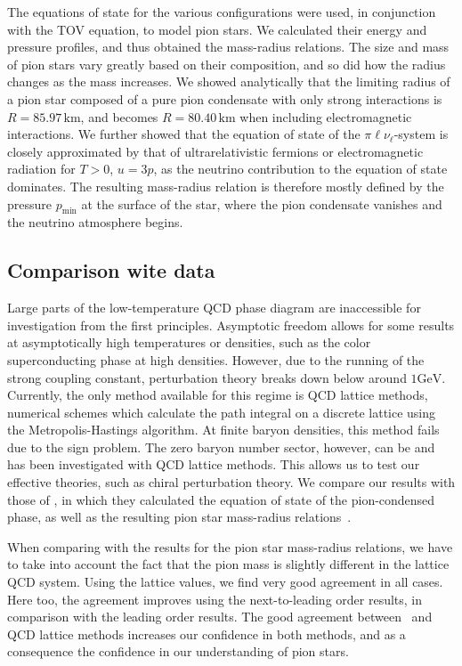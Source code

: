The equations of state for the various configurations were used, in conjunction with the TOV equation, to model pion stars.
We calculated their energy and pressure profiles, and thus obtained the mass-radius relations.
The size and mass of pion stars vary greatly based on their composition, and so did how the radius changes as the mass increases.
We showed analytically that the limiting radius of a pion star composed of a pure pion condensate with only strong interactions is $R = 85.97\,\text{km}$, and becomes $R = 80.40\,\text{km}$ when including electromagnetic interactions.
We further showed that the equation of state of the $\pi\ell\nu_\ell$-system is closely approximated by that of ultrarelativistic fermions or electromagnetic radiation for $T>0$, $u = 3p$, as the neutrino contribution to the equation of state dominates.
The resulting mass-radius relation is therefore mostly defined by the pressure $p_\text{min}$ at the surface of the star, where the pion condensate vanishes and the neutrino atmosphere begins.


\subsection{Comparison wite data}

Large parts of the low-temperature QCD phase diagram are inaccessible for investigation from the first principles.
Asymptotic freedom allows for some results at asymptotically high temperatures or densities, such as the color superconducting phase at high densities.
However, due to the running of the strong coupling constant, perturbation theory breaks down below around $1 \text{GeV}$.
Currently, the only method available for this regime is QCD lattice methods, numerical schemes which calculate the path integral on a discrete lattice using the Metropolis-Hastings algorithm.
At finite baryon densities, this method fails due to the sign problem.
The zero baryon number sector, however, can be and has been investigated with QCD lattice methods.
This allows us to test our effective theories, such as chiral perturbation theory.
We compare our results with those of \citeauthor{brandtNewClassCompact2018}, in which they calculated the equation of state of the pion-condensed phase, as well as the resulting pion star mass-radius relations~\autocite{brandtNewClassCompact2018}.

When comparing with the results for the pion star mass-radius relations, we have to take into account the fact that the pion mass is slightly different in the lattice QCD system.
Using the lattice values, we find very good agreement in all cases.
Here too, the agreement improves using the next-to-leading order results, in comparison with the leading order results.
The good agreement between \chpt\, and QCD lattice methods increases our confidence in both methods, and as a consequence the confidence in our understanding of pion stars.



